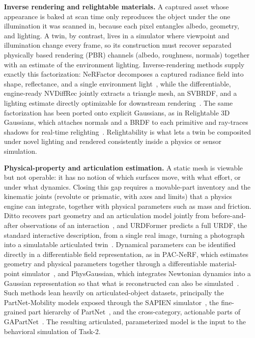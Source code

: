 \textbf{Inverse rendering and relightable materials.} A captured asset whose appearance is baked at scan time only reproduces the object under the one illumination it was scanned in, because each pixel entangles albedo, geometry, and lighting.
A twin, by contrast, lives in a simulator where viewpoint and illumination change every frame, so its construction must recover separated physically based rendering (PBR) channels (albedo, roughness, normals) together with an estimate of the environment lighting.
Inverse-rendering methods supply exactly this factorization: NeRFactor decomposes a captured radiance field into shape, reflectance, and a single environment light~\cite{zhang2021nerfactor}, while the differentiable, engine-ready NVDiffRec jointly extracts a triangle mesh, an SVBRDF, and a lighting estimate directly optimizable for downstream rendering~\cite{munkberg2022extracting}.
The same factorization has been ported onto explicit Gaussians, as in Relightable 3D Gaussians, which attaches normals and a BRDF to each primitive and ray-traces shadows for real-time relighting~\cite{gao2024relightable}. Relightability is what lets a twin be composited under novel lighting and rendered consistently inside a physics or sensor simulation.

\textbf{Physical-property and articulation estimation.} A static mesh is viewable but not operable: it has no notion of which surfaces move, with what effort, or under what dynamics. Closing this gap requires a movable-part inventory and the kinematic joints (revolute or prismatic, with axes and limits) that a physics engine can integrate, together with physical parameters such as mass and friction. Ditto recovers part geometry and an articulation model jointly from before-and-after observations of an interaction~\cite{jiang2022ditto}, and URDFormer predicts a full URDF, the standard interactive description, from a single real image, turning a photograph into a simulatable articulated twin~\cite{chen2024urdformer}. Dynamical parameters can be identified directly in a differentiable field representation, as in PAC-NeRF, which estimates geometry and physical parameters together through a differentiable material-point simulator~\cite{li2023pacnerf}, and PhysGaussian, which integrates Newtonian dynamics into a Gaussian representation so that what is reconstructed can also be simulated~\cite{xie2024physgaussian}. Such methods lean heavily on articulated-object datasets, principally the PartNet-Mobility models exposed through the SAPIEN simulator~\cite{xiang2020sapien}, the fine-grained part hierarchy of PartNet~\cite{mo2019partnet}, and the cross-category, actionable parts of GAPartNet~\cite{geng2023gapartnet}. The resulting articulated, parameterized model is the input to the behavioral simulation of Task-2.

